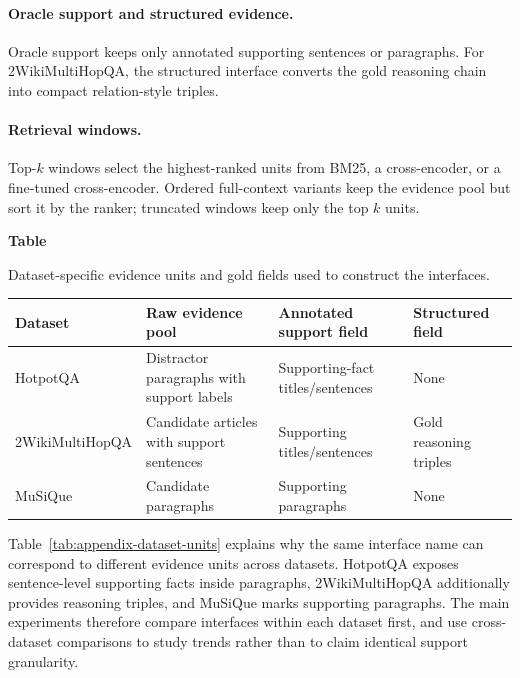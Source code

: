 \documentclass[a4paper,fleqn]{cas-sc}
\newcommand{\sidetablecaption}[2]{%
  \refstepcounter{table}\label{#1}%
  \begingroup
  \raggedright\footnotesize
  \textbf{Table~\thetable}\par
  #2\par
  \endgroup
  \vspace{3pt}
}
\begin{document}
\paragraph{Oracle support and structured evidence.}
Oracle support keeps only annotated supporting sentences or paragraphs.
For 2WikiMultiHopQA, the structured interface converts the gold reasoning chain
into compact relation-style triples.

\paragraph{Retrieval windows.}
Top-$k$ windows select the highest-ranked units from BM25, a cross-encoder, or a
fine-tuned cross-encoder. Ordered full-context variants keep the evidence pool
but sort it by the ranker; truncated windows keep only the top $k$ units.

\begin{center}
\sidetablecaption{tab:appendix-dataset-units}{Dataset-specific evidence units
and gold fields used to construct the interfaces.}
\scriptsize
\setlength{\tabcolsep}{3.2pt}
\begin{tabular}{>{\raggedright\arraybackslash}p{}
                >{\raggedright\arraybackslash}p{}
                >{\raggedright\arraybackslash}p{}
                >{\raggedright\arraybackslash}p{}}
\toprule
Dataset & Raw evidence pool & Annotated support field & Structured field \\
\midrule
HotpotQA & Distractor paragraphs with support labels &
Supporting-fact titles/sentences & None \\
2WikiMultiHopQA & Candidate articles with support sentences &
Supporting titles/sentences & Gold reasoning triples \\
MuSiQue & Candidate paragraphs &
Supporting paragraphs & None \\
\bottomrule
\end{tabular}
\end{center}

Table~\ref{tab:appendix-dataset-units} explains why the same interface name can
correspond to different evidence units across datasets. HotpotQA exposes
sentence-level supporting facts inside paragraphs, 2WikiMultiHopQA additionally
provides reasoning triples, and MuSiQue marks supporting paragraphs. The main
experiments therefore compare interfaces within each dataset first, and use
cross-dataset comparisons to study trends rather than to claim identical support
granularity.
\end{document}
